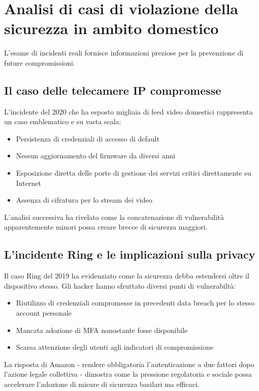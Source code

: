 \section{Analisi di casi di violazione della sicurezza in ambito domestico}

L'esame di incidenti reali fornisce informazioni preziose per la prevenzione di future compromissioni.

\subsection{Il caso delle telecamere IP compromesse}

L'incidente del 2020 che ha esposto migliaia di feed video domestici rappresenta un caso emblematico e su vasta scala:

\begin{itemize}
    \item Persistenza di credenziali di accesso di default 
    \item Nessun aggiornamento del firmware da diversi anni
    \item Esposizione diretta delle porte di gestione dei servizi critici direttamente su Internet
    \item Assenza di cifratura per lo stream dei video
\end{itemize}

L'analisi successiva ha rivelato come la concatenazione di vulnerabilità apparentemente minori possa creare brecce di sicurezza maggiori.

\subsection{L'incidente Ring e le implicazioni sulla privacy}

Il caso Ring del 2019 ha evidenziato come la sicurezza debba estendersi oltre il dispositivo stesso. Gli hacker hanno sfruttato diversi punti di vulnerabiltà:

\begin{itemize}
    \item Riutilizzo di credenziali compromesse in precedenti data breach per lo stesso account personale
    \item Mancata adozione di MFA nonostante fosse disponibile
    \item Scarsa attenzione degli utenti agli indicatori di compromissione
\end{itemize}

La risposta di Amazon - rendere obbligatoria l'autenticazione a due fattori dopo l'azione legale collettiva - dimostra come la pressione regolatoria e sociale possa accelerare l'adozione di misure di sicurezza basilari ma efficaci.


